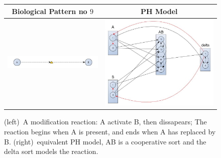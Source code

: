 \documentclass[11pt,a4paper,twoside]{epig}
\begin{document}
\begin{figure}[ht]
\begin{tabular}{|c|c|}
\hline
Biological Pattern no $9$ & PH Model \\
\hline
 \includegraphics[scale=0.3]{./imagesannexe/phdrawings/9cyt.jpg} & \includegraphics[scale=0.12]{./imagesannexe/phdrawings/9ph.jpg} \\
 \hline
\end{tabular}
\caption{\label{fig:pattern:9}
(left)~A modification reaction: A activate B, then dissapears; The reaction begins when A is present, and ends when A has replaced by B.
(right)~equivalent PH model, AB is a cooperative sort and the delta sort models the reaction.
}
\end{figure}
\end{document}
